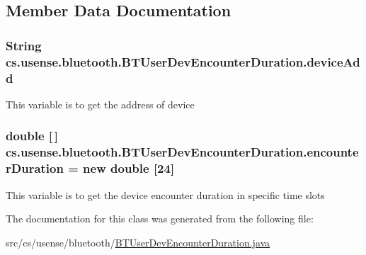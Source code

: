 \subsection{Member Data Documentation}
\hypertarget{classcs_1_1usense_1_1bluetooth_1_1_b_t_user_dev_encounter_duration_a57b2b34eda36119c23efe3d0170bc569}{}
\subsubsection[{device\+Add}]{\setlength{\rightskip}{0pt plus 5cm}String cs.\+usense.\+bluetooth.\+B\+T\+User\+Dev\+Encounter\+Duration.\+device\+Add\hspace{0.3cm}{\ttfamily [private]}}\label{classcs_1_1usense_1_1bluetooth_1_1_b_t_user_dev_encounter_duration_a57b2b34eda36119c23efe3d0170bc569}
This variable is to get the address of device \hypertarget{classcs_1_1usense_1_1bluetooth_1_1_b_t_user_dev_encounter_duration_a759c1959a43fb0d4832ef0dd224f0379}{}
\subsubsection[{encounter\+Duration}]{\setlength{\rightskip}{0pt plus 5cm}double \mbox{[}$\,$\mbox{]} cs.\+usense.\+bluetooth.\+B\+T\+User\+Dev\+Encounter\+Duration.\+encounter\+Duration = new double \mbox{[}24\mbox{]}\hspace{0.3cm}{\ttfamily [private]}}\label{classcs_1_1usense_1_1bluetooth_1_1_b_t_user_dev_encounter_duration_a759c1959a43fb0d4832ef0dd224f0379}
This variable is to get the device encounter duration in specific time slots 

The documentation for this class was generated from the following file\+:\begin{DoxyCompactItemize}
\item 
src/cs/usense/bluetooth/\hyperlink{_b_t_user_dev_encounter_duration_8java}{B\+T\+User\+Dev\+Encounter\+Duration.\+java}\end{DoxyCompactItemize}
